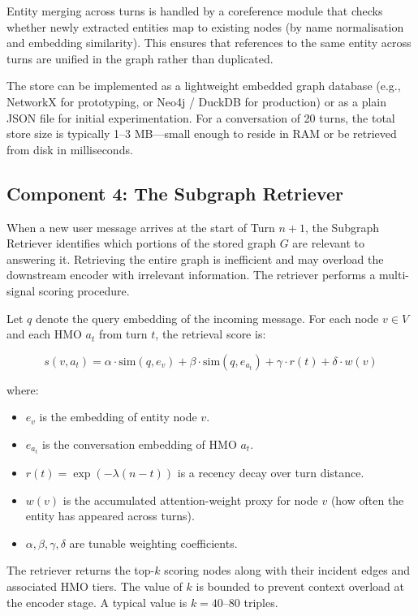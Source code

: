 \documentclass[11pt, a4paper, twoside]{article}
\theoremstyle{definition}
\begin{document}
Entity merging across turns is handled by a coreference module that checks whether
newly extracted entities map to existing nodes (by name normalisation and embedding
similarity). This ensures that references to the same entity across turns are
unified in the graph rather than duplicated.

The store can be implemented as a lightweight embedded graph database (e.g.,
NetworkX for prototyping, or Neo4j / DuckDB for production) or as a plain JSON
file for initial experimentation. For a conversation of 20 turns, the total store
size is typically 1--3 MB---small enough to reside in RAM or be retrieved from disk
in milliseconds.

\subsection{Component 4: The Subgraph Retriever}
\label{sec:retriever}

When a new user message arrives at the start of Turn $n+1$, the Subgraph Retriever
identifies which portions of the stored graph $G$ are relevant to answering it.
Retrieving the entire graph is inefficient and may overload the downstream encoder
with irrelevant information. The retriever performs a multi-signal scoring procedure.

\medskip

Let $q$ denote the query embedding of the incoming message. For each node $v \in V$
and each HMO $a_t$ from turn $t$, the retrieval score is:

\[
s(v, a_t) = \alpha \cdot \text{sim}(q, e_v)
           + \beta \cdot \text{sim}(q, e_{a_t})
           + \gamma \cdot r(t)
           + \delta \cdot w(v)
\]

where:
\begin{itemize}[leftmargin=*, itemsep=2pt]
  \item $e_v$ is the embedding of entity node $v$.
  \item $e_{a_t}$ is the conversation embedding of HMO $a_t$.
  \item $r(t) = \exp(-\lambda (n - t))$ is a recency decay over turn distance.
  \item $w(v)$ is the accumulated attention-weight proxy for node $v$ (how often
    the entity has appeared across turns).
  \item $\alpha, \beta, \gamma, \delta$ are tunable weighting coefficients.
\end{itemize}

The retriever returns the top-$k$ scoring nodes along with their incident edges
and associated HMO tiers. The value of $k$ is bounded to prevent context overload
at the encoder stage. A typical value is $k = 40$--$80$ triples.
\end{document}
